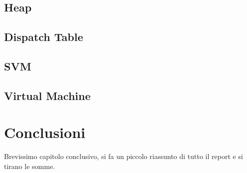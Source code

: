 \documentclass{scrreprt}
\begin{document}
\section{Heap}
\section{Dispatch Table}
\section{SVM}
\section{Virtual Machine}

\chapter{Conclusioni}
Brevissimo capitolo conclusivo, si fa un piccolo riassunto di tutto il report e si tirano le somme.
\end{document}
